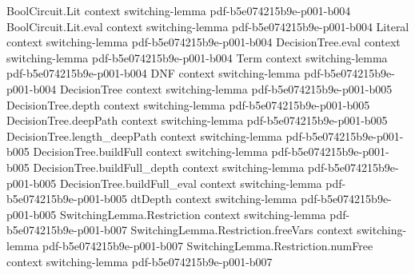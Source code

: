 \begin{lemma}
\label{SwitchingLemma.razborovEncode_fst_numFree_eq}
\leanok
{}
\proofstep
  {BoolCircuit.Lit}
  {context}
  {switching-lemma}
  {pdf-b5e074215b9e-p001-b004}
\proofstep
  {BoolCircuit.Lit.eval}
  {context}
  {switching-lemma}
  {pdf-b5e074215b9e-p001-b004}
\proofstep
  {Literal}
  {context}
  {switching-lemma}
  {pdf-b5e074215b9e-p001-b004}
\proofstep
  {DecisionTree.eval}
  {context}
  {switching-lemma}
  {pdf-b5e074215b9e-p001-b004}
\proofstep
  {Term}
  {context}
  {switching-lemma}
  {pdf-b5e074215b9e-p001-b004}
\proofstep
  {DNF}
  {context}
  {switching-lemma}
  {pdf-b5e074215b9e-p001-b004}
\proofstep
  {DecisionTree}
  {context}
  {switching-lemma}
  {pdf-b5e074215b9e-p001-b005}
\proofstep
  {DecisionTree.depth}
  {context}
  {switching-lemma}
  {pdf-b5e074215b9e-p001-b005}
\proofstep
  {DecisionTree.deepPath}
  {context}
  {switching-lemma}
  {pdf-b5e074215b9e-p001-b005}
\proofstep
  {DecisionTree.length_deepPath}
  {context}
  {switching-lemma}
  {pdf-b5e074215b9e-p001-b005}
\proofstep
  {DecisionTree.buildFull}
  {context}
  {switching-lemma}
  {pdf-b5e074215b9e-p001-b005}
\proofstep
  {DecisionTree.buildFull_depth}
  {context}
  {switching-lemma}
  {pdf-b5e074215b9e-p001-b005}
\proofstep
  {DecisionTree.buildFull_eval}
  {context}
  {switching-lemma}
  {pdf-b5e074215b9e-p001-b005}
\proofstep
  {dtDepth}
  {context}
  {switching-lemma}
  {pdf-b5e074215b9e-p001-b005}
\proofstep
  {SwitchingLemma.Restriction}
  {context}
  {switching-lemma}
  {pdf-b5e074215b9e-p001-b007}
\proofstep
  {SwitchingLemma.Restriction.freeVars}
  {context}
  {switching-lemma}
  {pdf-b5e074215b9e-p001-b007}
\proofstep
  {SwitchingLemma.Restriction.numFree}
  {context}
  {switching-lemma}
  {pdf-b5e074215b9e-p001-b007}

\end{lemma}

